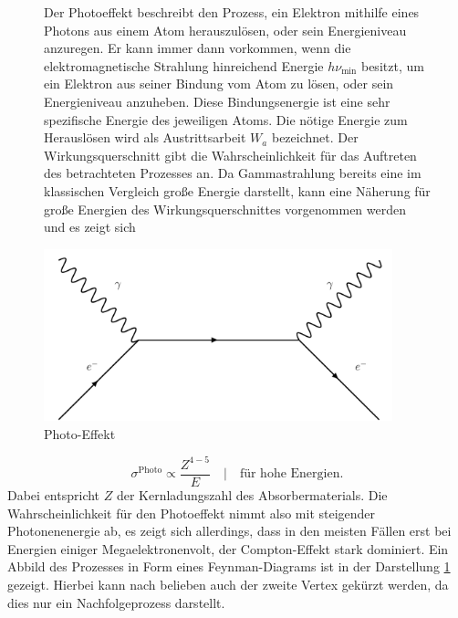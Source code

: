 \begin{figure}
\begin{minipage}{0.5\textwidth}
Der Photoeffekt beschreibt den Prozess, ein Elektron mithilfe eines Photons aus einem Atom herauszulösen, oder sein Energieniveau anzuregen. 
Er kann immer dann vorkommen, wenn die elektromagnetische Strahlung hinreichend Energie $h\nu_{\text{min}}$ besitzt, um ein Elektron aus seiner Bindung vom Atom zu lösen, oder sein Energieniveau anzuheben. 
Diese Bindungsenergie ist eine sehr spezifische Energie des jeweiligen Atoms. Die nötige Energie zum Herauslösen wird als Austrittsarbeit $W_a$ bezeichnet. 
Der Wirkungsquerschnitt gibt die Wahrscheinlichkeit für das Auftreten des betrachteten Prozesses an.
Da Gammastrahlung bereits eine im klassischen Vergleich große Energie darstellt, kann eine Näherung für große Energien des Wirkungsquerschnittes vorgenommen werden und es zeigt sich
\end{minipage}
\begin{minipage}{0.5\textwidth}
    \centering
    \includegraphics[width=0.9\textwidth]{bilder/compton.pdf}
    \caption{Photo-Effekt}
    \label{fig:hierhier}
\end{minipage}
\end{figure}

\begin{equation*}
\sigma^{\text{Photo}} \propto \frac{Z^{4-5}}{E} \quad | \quad \text{für hohe Energien}.
\end{equation*}
Dabei entspricht $Z$ der Kernladungszahl des Absorbermaterials. 
Die Wahrscheinlichkeit für den Photoeffekt nimmt also mit steigender Photonenenergie ab, es zeigt sich allerdings, dass in den meisten Fällen erst bei Energien einiger Megaelektronenvolt, der Compton-Effekt stark dominiert. 
Ein Abbild des Prozesses in Form eines Feynman-Diagrams ist in der Darstellung \ref{fig:hierhier} gezeigt. Hierbei kann nach belieben auch der zweite Vertex gekürzt werden, da dies nur ein Nachfolgeprozess darstellt.
\newpage
